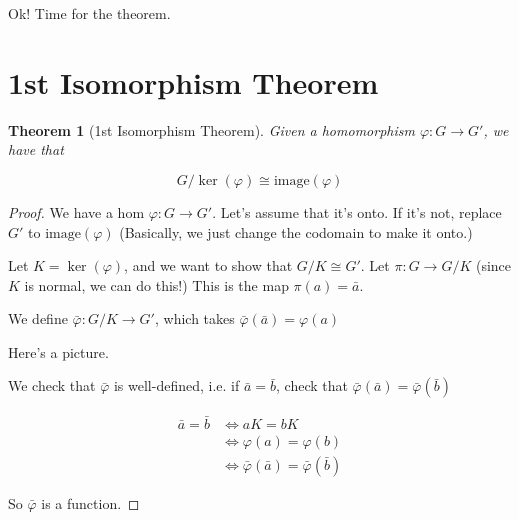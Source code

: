\documentclass[12pt]{article}
\def\image{\text{image}}
\newtheorem{theorem}{Theorem}
\theoremstyle{remark}
\theoremstyle{remark}
\theoremstyle{remark}
\theoremstyle{remark}
\theoremstyle{remark}
\begin{document}
Ok! Time for the theorem.

\section{1st Isomorphism Theorem}

\begin{theorem}[1st Isomorphism Theorem]
  Given a homomorphism $\varphi: G \to G'$, we have that

  \[
    G / \ker(\varphi) \cong \image(\varphi)
  \]
\end{theorem}

\begin{proof}
  We have a hom $\varphi: G \to G'$. Let's assume that it's onto. If it's not,
  replace $G'$ to $\image(\varphi)$ (Basically, we just change the codomain to
  make it onto.)

  Let $K = \ker(\varphi)$, and we want to show that $G / K \cong G'$. Let $\pi:
  G \to G / K$ (since $K$ is normal, we can do this!) This is the map $\pi(a) =
  \bar a$.

  We define $\bar \varphi: G / K \to G'$, which takes $\bar \varphi(\bar a) =
  \varphi(a)$


  Here's a picture.

  \begin{center}
  \end{center}


  We check that $\bar \varphi$ is well-defined, i.e. if $\bar a = \bar b$, check
  that $\bar \varphi(\bar a) = \bar \varphi(\bar b)$

  \begin{align*}
    \bar a = \bar b &\Leftrightarrow aK = bK \\
                    &\Leftrightarrow \varphi(a) = \varphi(b) \\
                    &\Leftrightarrow \bar \varphi(\bar a) = \bar \varphi(\bar b)
  \end{align*}

  So $\bar \varphi$ is a function.


\end{proof}
\end{document}
